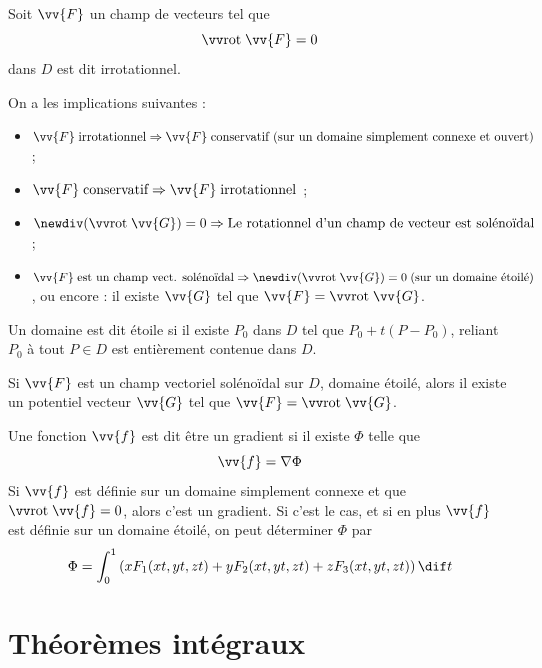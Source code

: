 \begin{mydef} Soit $\vv{F}$ un champ de vecteurs tel que
	\[ \rot \vv{F} = 0 \]
	dans $D$ est dit irrotationnel.
\end{mydef}

\begin{myprop} On a les implications suivantes :
	\begin{itemize}
		\item $ \vv{F} \; \text{irrotationnel} \Rightarrow \vv{F} \; \text{conservatif (sur un domaine simplement connexe et ouvert)} $ ;
		\item $ \vv{F} \;\text{conservatif} \Rightarrow \vv{F} \;\text{irrotationnel} $ ;
		\item $ \newdiv (\rot \vv{G}) = 0  \Rightarrow \text{Le rotationnel d'un champ de vecteur est solénoïdal} $ ;
		\item $ \vv{F} \;\text{est un champ vect. solénoïdal} \Rightarrow \newdiv (\rot \vv{G}) = 0 \;\text{(sur un domaine étoilé)} $, ou encore : il existe $\vv{G}$ tel que $\vv{F} = \rot \vv{G}$.
	\end{itemize}
\end{myprop}

\begin{mydef}
	Un domaine est dit étoile si il existe $P_0$ dans $D$ tel que $P_0 + t(P - P_0)$, reliant $P_0$ à tout $P \in D$ est entièrement contenue dans $D$.
\end{mydef}

\begin{myprop}
	Si $\vv{F}$ est un champ vectoriel solénoïdal sur $D$, domaine étoilé, alors il existe un potentiel vecteur $\vv{G}$ tel que $\vv{F} = \rot \vv{G}$.
\end{myprop}

\begin{myform}
	Une fonction $\vv{f}$ est dit être un gradient si il existe $\Phi$ telle que
	\[ \vv{f} = \nabla \Phi \]
	Si $\vv{f}$ est définie sur un domaine simplement connexe et que $\rot \vv{f} = 0$, alors c'est un gradient.
	Si c'est le cas, et si en plus $\vv{f}$ est définie sur un domaine étoilé, on peut déterminer $\Phi$ par
	\[ \Phi = \int_0^1 \left( x F_1(xt,yt,zt) + y F_2(xt,yt,zt) + z F_3(xt,yt,zt) \right) \dif t \]
\end{myform}

\section{Théorèmes intégraux}

